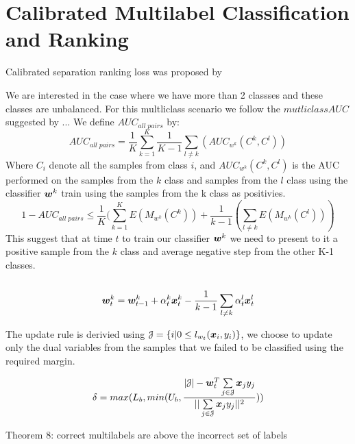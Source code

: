 \section{Calibrated Multilabel Classification and Ranking}

Calibrated separation ranking loss was proposed by \cite{GuoShuurmans11}

We are interested in the case where we have more than 2 classses and these classes are unbalanced. For this multliclass scenario we follow the $mutliclass AUC$ suggested by ... 
We define $AUC_{all \; pairs}$ by:
\[
	AUC_{all \; pairs} = \frac{1}{K} \sum\limits_{k=1}^{K}  \frac{1}{K-1}\sum\limits_{l \neq k} (AUC_{w^k}(C^k, C^l)) 
\]
Where $C_i$ denote all the samples from class $i$, and $AUC_{w^k}(C^k, C^l)$ is the AUC performed on the samples from the $k$ class and samples from the $l$ class using the classifier $ \bm{w}^k $ train using the samples from the k class as positivies.
\[
1 - AUC_{all \; pairs} \leq \frac{1}{K} ( \sum\limits_{k=1}^{K} E(M_{w^k}(C^k)) + \frac{1}{k-1} ( \sum\limits_{l \neq k}  E(M_{w^k}(C^l)) )
\]
This suggest that at time $t$ to train our classifier $\bm{w}^k $ we need to present to it a positive sample from the $k$ class and average negative step from the other K-1 classes.\\
\\
\[
  \bm{w}^k_t = \bm{w}^k_{t-1} + \alpha^k_t \bm{x}^k_t - \frac{1}{k-1}\sum\limits_{l \neq k} \alpha^l_t \bm{x}^l_t
\]


The update rule is derivied using $\mathcal{J} = \{ i | 0 \leq l_{w_t}(\bm{x}_i, y_i) \}$, we choose to update only the dual variables from the samples that we failed to be classified using the required margin.

\[ \delta = max(L_b   , min(U_b , \frac{|\mathcal{J}| - \bm{w}_t^T \sum\limits_{j \in \mathcal{J}} {\bm{x}_j y_j}   }{|| \sum\limits_{j \in \mathcal{J} }{\bm{x}_j y_j} ||^2 }  ) )
\]

Theorem 8: correct multilabels are above the incorrect set of labels
